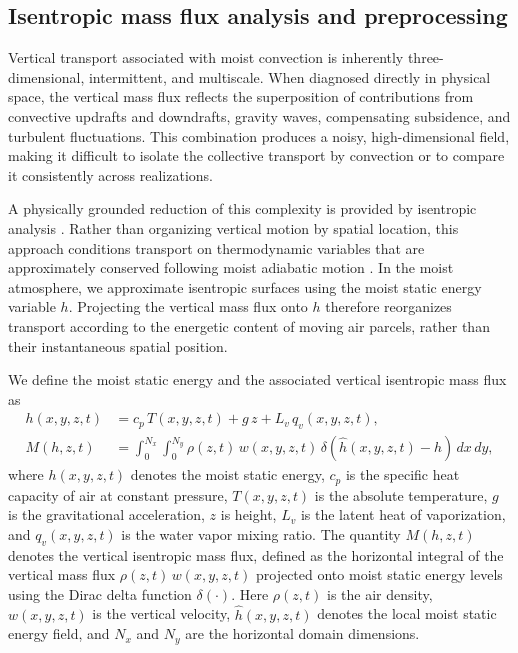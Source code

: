 \documentclass[11pt]{article}
\begin{document}
\subsection{Isentropic mass flux analysis and preprocessing}

Vertical transport associated with moist convection is inherently three-dimensional, intermittent, and multiscale. When diagnosed directly in physical space, the vertical mass flux reflects the superposition of contributions from convective updrafts and downdrafts, gravity waves, compensating subsidence, and turbulent fluctuations. This combination produces a noisy, high-dimensional field, making it difficult to isolate the collective transport by convection or to compare it consistently across realizations.

A physically grounded reduction of this complexity is provided by isentropic analysis \cite{pauluis2013isentropic}. Rather than organizing vertical motion by spatial location, this approach conditions transport on thermodynamic variables that are approximately conserved following moist adiabatic motion \cite{chen2022crucial}. In the moist atmosphere, we approximate isentropic surfaces using the moist static energy variable $h$. Projecting the vertical mass flux onto $h$ therefore reorganizes transport according to the energetic content of moving air parcels, rather than their instantaneous spatial position.

We define the moist static energy and the associated vertical isentropic mass flux as
\begin{align}
    h(x,y,z,t) & = c_p\, T(x,y,z,t)+ g\, z + L_v\, q_v(x,y,z,t),\\ 
    M(h,z,t) &= \int_{0}^{N_x}\int_{0}^{N_y} \rho(z,t)\,w(x,y,z,t)\,
    \delta\!\left(\hat{h}(x,y,z,t)-h\right)\,dx\,dy,
\end{align}
where $h(x,y,z,t)$ denotes the moist static energy, $c_p$ is the specific heat capacity of air at constant pressure, $T(x,y,z,t)$ is the absolute temperature, $g$ is the gravitational acceleration, $z$ is height, $L_v$ is the latent heat of vaporization, and $q_v(x,y,z,t)$ is the water vapor mixing ratio. The quantity $M(h,z,t)$ denotes the vertical isentropic mass flux, defined as the horizontal integral of the vertical mass flux $\rho(z,t)\,w(x,y,z,t)$ projected onto moist static energy levels using the Dirac delta function $\delta(\cdot)$. Here $\rho(z,t)$ is the air density, $w(x,y,z,t)$ is the vertical velocity, $\hat{h}(x,y,z,t)$ denotes the local moist static energy field, and $N_x$ and $N_y$ are the horizontal domain dimensions.
\end{document}
